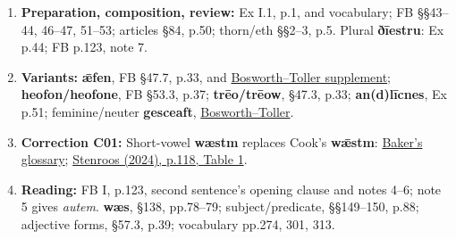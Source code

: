 \begin{enumerate}
\item[1.] \textbf{Preparation, composition, review:} Ex I.1, p.1, and vocabulary; FB §§43–44, 46–47, 51–53; articles §84, p.50; thorn/eth §§2–3, p.5. Plural \textbf{ðīestru}: Ex p.44; FB p.123, note 7.
\item[2.] \textbf{Variants:} \textbf{ǣfen}, FB §47.7, p.33, and \href{https://bosworthtoller.com/37608}{Bosworth–Toller supplement}; \textbf{heofon/\allowbreak heofone}, FB §53.3, p.37; \textbf{trēo/trēow}, §47.3, p.33; \textbf{an(d)līcnes}, Ex p.51; feminine/neuter \textbf{gesceaft}, \href{https://bosworthtoller.com/15847}{Bosworth–Toller}.
\item[3.] \textbf{Correction C01:} Short-vowel \textbf{wæstm} replaces Cook's \textbf{wǣstm}: \href{https://glossary.oldenglishaerobics.net/oeaginfo.php?objid=xwaestm\&objtype=gentry}{Baker's glossary}; \href{https://doi.org/10.17811/selim.29.2024.109-25}{Stenroos (2024), p.118, Table 1}.
\item[4.] \textbf{Reading:} FB I, p.123, second sentence's opening clause and notes 4–6; note 5 gives \textit{autem}. \textbf{wæs}, §138, pp.78–79; subject/predicate, §§149–150, p.88; adjective forms, §57.3, p.39; vocabulary pp.274, 301, 313.
\end{enumerate}



\endgroup

